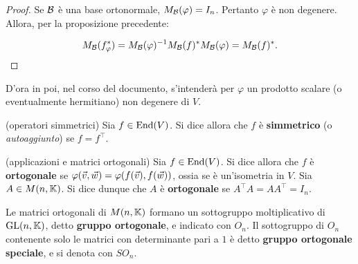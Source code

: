 \begin{proof}
	Se $\mathcal{B}$ è una base ortonormale, $M_{\mathcal{B}}(\varphi) = I_n$. Pertanto $\varphi$ è
	non degenere. Allora, per la proposizione precedente:
	
	\[ M_{\mathcal{B}}(f_\varphi^*) = M_{\mathcal{B}}(\varphi)^{-1} M_{\mathcal{B}}(f)^* M_{\mathcal{B}}(\varphi) = M_{\mathcal{B}}(f)^*. \]
\end{proof}

\begin{note}
	D'ora in poi, nel corso del documento, s'intenderà per $\varphi$ un prodotto scalare (o eventualmente hermitiano) non degenere di $V$.
\end{note}

\begin{definition} (operatori simmetrici)
	Sia $f \in \operatorname{End}(V)$. Si dice allora che $f$ è \textbf{simmetrico} (o \textit{autoaggiunto}) se $f = f^\top$.
\end{definition}

\begin{definition} (applicazioni e matrici ortogonali)
	Sia $f \in \operatorname{End}(V)$. Si dice allora che $f$ è \textbf{ortogonale} se $\varphi(\v, \w) = \varphi(f(\v), f(\w))$,
	ossia se è un'isometria in $V$.
	Sia $A \in M(n, \mathbb{K})$. Si dice dunque che $A$ è \textbf{ortogonale} se $A^\top A = A A^\top = I_n$.
\end{definition}

\begin{definition}
	Le matrici ortogonali di $M(n, \mathbb{K})$ formano un sottogruppo moltiplicativo di $\operatorname{GL}(n, \mathbb{K})$, detto \textbf{gruppo ortogonale},
	e indicato con $O_n$. Il sottogruppo di $O_n$ contenente solo le matrici con determinante pari a $1$ è
	detto \textbf{gruppo ortogonale speciale}, e si denota con $SO_n$.
\end{definition}

